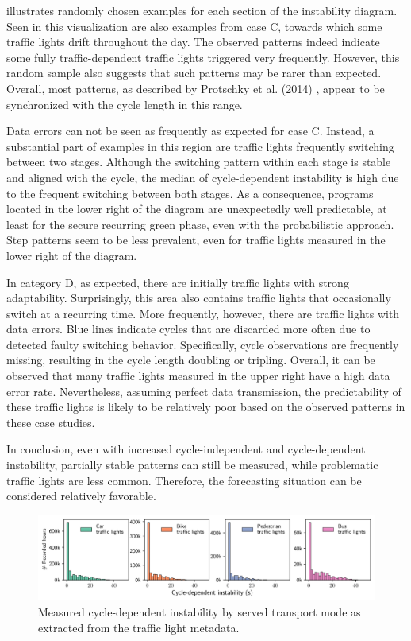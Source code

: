 illustrates randomly chosen examples for each section of the instability diagram. Seen in this visualization are also examples from case C, towards which some traffic lights drift throughout the day. The observed patterns indeed indicate some fully traffic-dependent traffic lights triggered very frequently. However, this random sample also suggests that such patterns may be rarer than expected. Overall, most patterns, as described by Protschky et al. (2014) \cite{protschky_extensive_2014}, appear to be synchronized with the cycle length in this range.

Data errors can not be seen as frequently as expected for case C. Instead, a substantial part of examples in this region are traffic lights frequently switching between two stages. Although the switching pattern within each stage is stable and aligned with the cycle, the median of cycle-dependent instability is high due to the frequent switching between both stages. As a consequence, programs located in the lower right of the diagram are unexpectedly well predictable, at least for the secure recurring green phase, even with the probabilistic approach. Step patterns seem to be less prevalent, even for traffic lights measured in the lower right of the diagram.

In category D, as expected, there are initially traffic lights with strong adaptability. Surprisingly, this area also contains traffic lights that occasionally switch at a recurring time. More frequently, however, there are traffic lights with data errors. Blue lines indicate cycles that are discarded more often due to detected faulty switching behavior. Specifically, cycle observations are frequently missing, resulting in the cycle length doubling or tripling. Overall, it can be observed that many traffic lights measured in the upper right have a high data error rate. Nevertheless, assuming perfect data transmission, the predictability of these traffic lights is likely to be relatively poor based on the observed patterns in these case studies.

In conclusion, even with increased cycle-independent and cycle-dependent instability, partially stable patterns can still be measured, while problematic traffic lights are less common. Therefore, the forecasting situation can be considered relatively favorable.

\begin{figure}[ht]
    \centering
    \includegraphics[width=\linewidth]{images/predictability-by-lanes.pdf}
    \caption{Measured cycle-dependent instability by served transport mode as extracted from the traffic light metadata.}\label{fig:predictability-by-lanes}
\end{figure}

